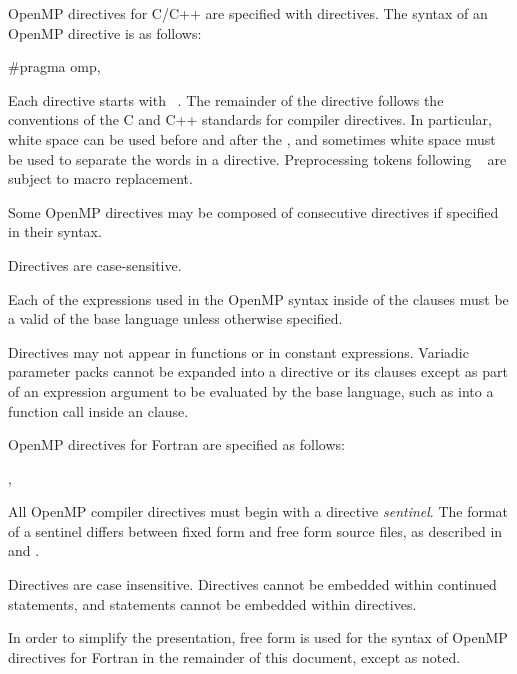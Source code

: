 \begin{ccppspecific}
OpenMP directives for C/C++ are specified with  directives.
The syntax of an OpenMP directive is as follows:

\begin{ompcPragma}
#pragma omp\plc{ directive-name [clause[ [},\plc{] clause] ... ] new-line}
\end{ompcPragma}

Each directive  starts with ~. The remainder of 
the directive follows the conventions of the C and C++ standards for compiler 
directives. In particular, white space can be used before and after the \pcode{\#}, 
and sometimes white space must be used to separate the words in a directive. 
Preprocessing tokens following ~
are subject to macro replacement.

Some OpenMP directives may be composed of consecutive 
directives if specified in their syntax.

Directives are case-sensitive.

Each of the expressions used in the OpenMP syntax inside of the clauses
must be a valid  of the base language unless
otherwise specified.
\end{ccppspecific}

\begin{cppspecific}
Directives may not appear in  functions or in constant expressions.
Variadic parameter packs cannot be expanded into a directive or its clauses
except as part of an expression argument to be evaluated by the base language,
such as into a function call inside an  clause.
\end{cppspecific}

\begin{fortranspecific}
OpenMP directives for Fortran are specified as follows:

\begin{ompfPragma}
\plc{sentinel directive-name [clause[ [},\plc{] clause]...]}
\end{ompfPragma}

All OpenMP compiler directives must begin with a directive \emph{sentinel}. 
The format of a sentinel differs between fixed form and free form source files, 
as described in  and 
.

Directives are case insensitive. Directives cannot be embedded within continued
statements, and statements cannot be embedded within directives.

In order to simplify the presentation, free form is used for the syntax of OpenMP
directives for Fortran in the remainder of this document, except as noted.
\end{fortranspecific}

